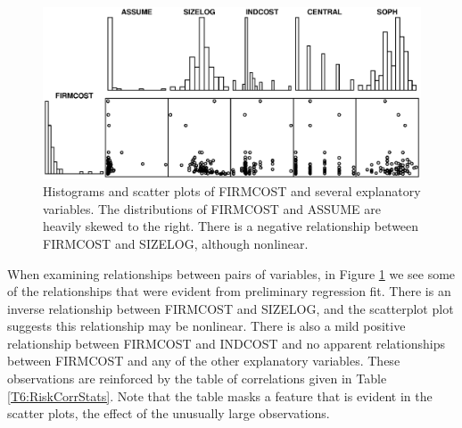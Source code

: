 \begin{figure}[htp]
  \begin{center}
   \includegraphics[width=1\textwidth]{Chapter6/F6SurveyBasicPlot.eps}
    \caption{\label{F6:SurveyBasicPlot} \small {Histograms and
    scatter plots of FIRMCOST and several explanatory variables. The
    distributions of FIRMCOST and ASSUME are heavily skewed to the
    right. There is a negative relationship between FIRMCOST and
    SIZELOG, although nonlinear.}}
      \end{center}
\end{figure}


When examining relationships between pairs of variables, in Figure
\ref{F6:SurveyBasicPlot} we see some of the relationships that were
evident from preliminary regression fit. There is an inverse
relationship between FIRMCOST and SIZELOG, and the scatterplot plot
suggests this relationship may be nonlinear. There is also a mild
positive relationship between FIRMCOST and INDCOST and no apparent
relationships between FIRMCOST and any of the other explanatory
variables. These observations are reinforced by the table of
correlations given in Table \ref{T6:RiskCorrStats}. Note that the
table masks a feature that is evident in the scatter plots, the
effect of the unusually large observations.


